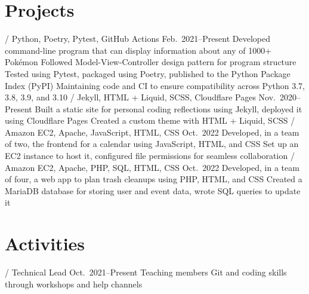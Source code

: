 \section{Projects}
\begin{doutline}
    \1[Pokésummary] / Python, Poetry, Pytest, GitHub Actions
    \hfill Feb.\ 2021--Present
        \2 Developed command-line program that can display information about any of 1000+ Pokémon
            \3 Followed Model-View-Controller design pattern for program structure
            \3 Tested using Pytest, packaged using Poetry, published to the Python Package Index (PyPI)
        \2 Maintaining code and CI to ensure compatibility across Python 3.7, 3.8, 3.9, and 3.10
     / Jekyll, HTML + Liquid, SCSS, Cloudflare Pages
    \hfill Nov.\ 2020--Present
        \2 Built a static site for personal coding reflections using Jekyll, deployed it using Cloudflare Pages
            \3 Created a custom theme with HTML + Liquid, SCSS
     / Amazon EC2, Apache, JavaScript, HTML, CSS
    \hfill Oct.\ 2022
        \2 Developed, in a team of two, the frontend for a calendar using JavaScript, HTML, and CSS
        \2 Set up an EC2 instance to host it, configured file permissions for seamless collaboration
    \1[Trashfree] / Amazon EC2, Apache, PHP, SQL, HTML, CSS
    \hfill Oct.\ 2022
        \2 Developed, in a team of four, a web app to plan trash cleanups using PHP, HTML, and CSS
        \2 Created a MariaDB database for storing user and event data, wrote SQL queries to update it
\end{doutline}

\section{Activities}
\begin{doutline}
     / Technical Lead
    \hfill Oct.\ 2021--Present
        \2 Teaching members Git and coding skills through workshops and help channels
\end{doutline}
